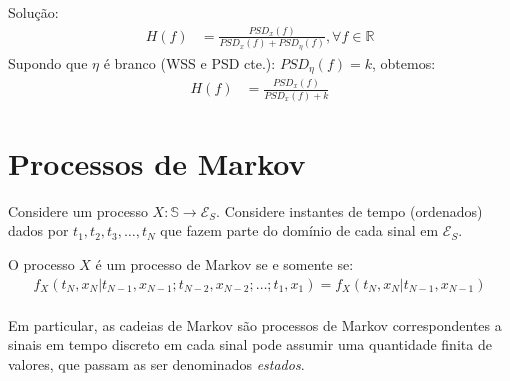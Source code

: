 \documentclass{article}
\begin{document}
Solução:
\begin{align*}
    H(f) &= \frac{PSD_x(f)}{PSD_x(f)+PSD_\eta(f)}, \forall f \in \mathbb{R}
\end{align*}
Supondo que $\eta$ é branco (WSS e PSD cte.): $PSD_\eta(f) = k$, obtemos:
\begin{align*}
    H(f) &= \frac{PSD_x(f)}{PSD_x(f)+k}
\end{align*}

\section{Processos de Markov}
Considere um processo $X: \mathbb{S} \to \mathcal{E}_S$. Considere instantes de tempo (ordenados) dados por
$t_1, t_2, t_3, \ldots, t_N$ que fazem parte do domínio de cada sinal em $\mathcal{E}_S$.

O processo $X$ é um processo de Markov se e somente se:
\begin{align*}
    f_X(t_N,x_N|t_{N-1},x_{N-1};t_{N-2},x_{N-2};\ldots;t_1,x_1) = f_X(t_N,x_N|t_{N-1},x_{N-1})\\[-1.75em]
\end{align*}

Em particular, as cadeias de Markov são processos de Markov correspondentes a sinais em tempo
discreto em cada sinal pode assumir uma quantidade finita de valores, que passam as ser denominados
\textit{estados}.
\end{document}
